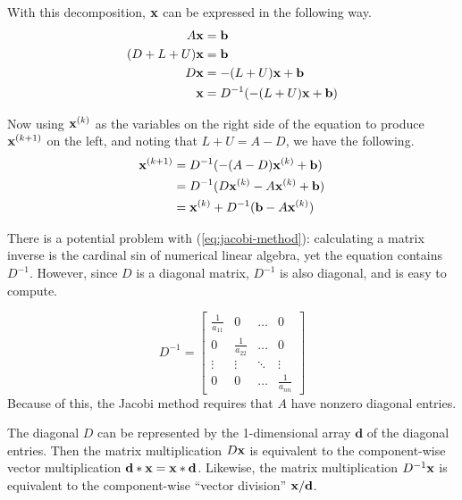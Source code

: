 With this decomposition, $\mathbf{x}$ can be expressed in the following way.
\begin{align*}
A\mathbf{x} &= \mathbf{b}\\
(D + L + U)\mathbf{x} &= \mathbf{b}\\
D\mathbf{x} &= -(L+U)\mathbf{x} + \mathbf{b}\\
\mathbf{x} &= D^{-1}(-(L+U)\mathbf{x} + \mathbf{b})
\end{align*}

Now using $\mathbf{x}^{(k)}$ as the variables on the right side of the equation to produce $\mathbf{x}^{(k+1)}$ on the left, and noting that $L+U=A-D$, we have the following.
\begin{align}
\nonumber \mathbf{x}^{(k+1)} &= D^{-1}(-(A-D)\mathbf{x}^{(k)} + \mathbf{b}) \\
\nonumber &= D^{-1}(D\mathbf{x}^{(k)} - A\mathbf{x}^{(k)}  + \mathbf{b})\\
&= \mathbf{x}^{(k)} + D^{-1}(\mathbf{b} - A\mathbf{x}^{(k)})
\label{eq:jacobi-method}
\end{align}

There is a potential problem with (\ref{eq:jacobi-method}): calculating a matrix inverse is the cardinal sin of numerical linear algebra, yet the equation contains $D^{-1}$.
However, since $D$ is a diagonal matrix, $D^{-1}$ is also diagonal, and is easy to compute.

\[
D^{-1} =
\left[\begin{array}{cccc}
    \frac{1}{a_{11}} & 0                & \ldots & 0      \\
    0                & \frac{1}{a_{22}} & \ldots & 0      \\
    \vdots           & \vdots           & \ddots & \vdots \\
    0                & 0                & \ldots & \frac{1}{a_{nn}}
\end{array}\right]
\]
Because of this, the Jacobi method requires that $A$ have nonzero diagonal entries.

The diagonal $D$ can be represented by the 1-dimensional array $\mathbf{d}$ of the diagonal entries. %
Then the matrix multiplication $D\mathbf{x}$ is equivalent to the component-wise vector multiplication $\mathbf{d}*\mathbf{x} = \mathbf{x}*\mathbf{d}$.
Likewise, the matrix multiplication $D^{-1}\mathbf{x}$ is equivalent to the component-wise ``vector division'' $\mathbf{x}/\mathbf{d}$.

\begin{comment}%
\begin{lstlisting}
>>> import numpy as np

>>> D = np.array([[2,0],[0,16]])    # Let D be a diagonal matrix.
>>> d = np.diag(D)                  # Extract the diagonal as a 1-D array.
>>> x = np.random.random(2)
>>> np.allclose(D.dot(x), d*x)
<<True>>
\end{lstlisting}
\end{comment}

